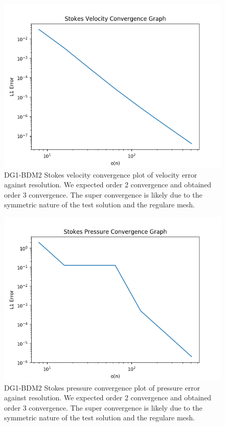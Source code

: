 \documentclass[11pt,twoside,a4paper]{article}
\begin{document}
\begin{figure}
  \includegraphics[width=\linewidth]{stokes_convergence_dbc0.png}
  \caption{DG1-BDM2 Stokes velocity convergence plot of velocity error against resolution. We expected order 2 convergence and obtained order 3 convergence. The super convergence is likely due to the symmetric nature of the test solution and the regulare mesh.}
\end{figure}

\begin{figure}
\includegraphics[width=\linewidth]{stokes_pressure_convergence_dbc0.png}
  \caption{DG1-BDM2 Stokes pressure convergence plot of pressure error against resolution. We expected order 2 convergence and obtained order 3 convergence. The super convergence is likely due to the symmetric nature of the test solution and the regulare mesh.}
\end{figure}
\end{document}
